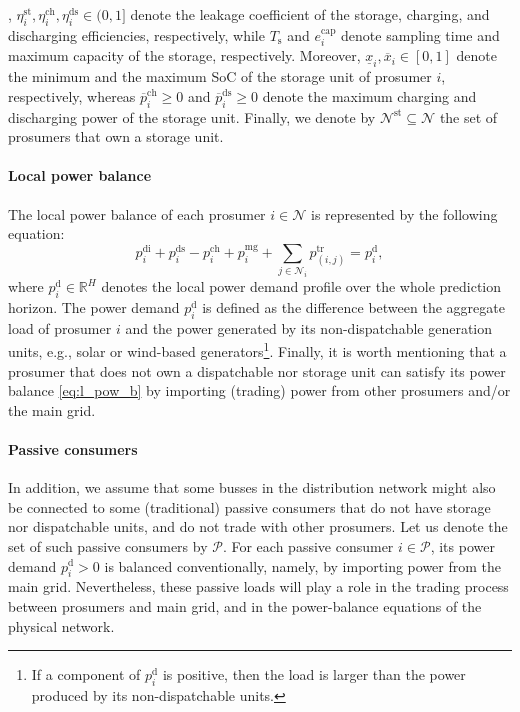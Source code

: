\documentclass{IEEEtran}  %
\newcommand{\mc}{\mathcal}
\newcommand{\0}{\mathbf{0}}
\newcommand{\1}{\mathbf{1}}
\begin{document}
, {$\eta_i^{\mathrm{st}}, \eta_i^{\mathrm{ch}}, \eta_i^{\mathrm{ds}} \in (0,1]$ denote  the leakage coefficient of the storage, charging, and discharging efficiencies, respectively, while }  %
$T_{\mathrm{s}}$ and $e^{\mathrm{cap}}_{i}$ denote sampling time and maximum capacity of the storage, respectively. Moreover, $\underline{x}_i,\overline{x}_i  \in [0,1]$  denote the minimum and the maximum SoC of the storage unit of prosumer $i$, respectively, whereas ${\overline p^{\mathrm{ch}}_i} \geq 0$ and ${\overline p^{\mathrm{ds}}_i} \geq 0$ denote the maximum charging and discharging power of the storage unit. Finally, we denote by  $\mathcal{N}^{\mathrm{st}}\subseteq\mathcal{N}$ 	the set of prosumers that own a storage unit.


\smallskip
\paragraph*{Local power balance} 
The local power balance of each prosumer $i \in \mc N$ is represented by the following equation:
\begin{equation}
p_{i}^{\mathrm{di}}+{p_{i}^{\mathrm{ds}}-p_{i}^{\mathrm{ch}}}+p_{i}^{\mathrm{mg}}+\sum_{j\in \mathcal{N}_i}p_{(i,j)}^{\text{tr}}=p_{i}^{\mathrm{d}}, \label{eq:l_pow_b}
\end{equation}
where $p_{i}^{\mathrm{d}} \in \mathbb{R}^{H}$ denotes the local power demand profile over the whole prediction horizon. The power demand $p_{i}^{\mathrm{d}}$ is defined as the difference between the aggregate load of prosumer $i$ and the power generated by its non-dispatchable generation units, e.g., solar or wind-based generators\footnote{If a component of $p_{i}^{\mathrm{d}}$ is positive, then the load is larger than the power produced by its non-dispatchable units.}.
Finally, it is worth mentioning that a prosumer that does not own a dispatchable nor storage unit can satisfy its power balance \eqref{eq:l_pow_b} by importing (trading) power from other prosumers and/or the main grid.

\smallskip
\paragraph*{Passive consumers}
In addition, we assume that some busses in the distribution network might also be connected to some (traditional) passive consumers that do not have storage nor dispatchable units, and do not trade with other prosumers. Let us denote the set of such passive consumers by $\mc P$. For each passive consumer $i \in \mc P$, its power demand $p_i^{\mathrm d}>0$ is balanced conventionally, namely, by importing power from the main grid. Nevertheless, these passive loads will play a role in the trading process between prosumers and main grid, and in the power-balance equations of the physical network.
\color{black}
\end{document}
